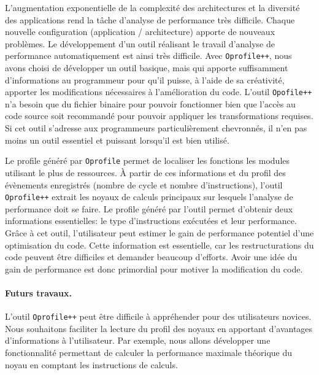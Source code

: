     L'augmentation exponentielle de la complexité des architectures et la diversité des applications rend la tâche d'analyse de performance très difficile. Chaque nouvelle configuration (application / architecture) apporte de nouveaux problèmes. Le développement d'un outil réalisant le travail d'analyse de performance automatiquement est ainsi très difficile. Avec \verb|Oprofile++|, nous avons choisi de développer un outil basique, mais qui apporte suffisamment d'informations au programmeur pour qu'il puisse, à l'aide de sa créativité, apporter les modifications nécessaires à l'amélioration du code. L'outil \verb|Opofile++| n'a besoin que du fichier binaire pour pouvoir fonctionner bien que l'accès au code source soit recommandé pour pouvoir appliquer les transformations requises. Si cet outil s'adresse aux programmeurs particulièrement chevronnés, il n'en pas moins un outil essentiel et puissant lorsqu'il est bien utilisé. 
    
    Le profile généré par \verb|Oprofile| permet de localiser les fonctions les modules utilisant le plus de ressources. À partir de ces informations et du profil des évènements enregistrés (nombre de cycle et nombre d'instructions), l'outil \verb|Oprofile++| extrait les noyaux de calculs principaux sur lesquels l'analyse de performance doit se faire. Le profile généré par l'outil permet d'obtenir deux informations essentielles: le type d'instructions exécutées et leur performance. Grâce à cet outil, l'utilisateur peut estimer le gain de performance potentiel d'une optimisation du code. Cette information est essentielle, car les restructurations du code peuvent être difficiles et demander beaucoup d'efforts. Avoir une idée du gain de performance est donc primordial pour motiver la modification du code. 


    \paragraph{Futurs travaux.} L'outil \verb|Oprofile++| peut être difficile à appréhender pour des utilisateurs novices. Nous souhaitons faciliter la lecture du profil des noyaux en apportant d'avantages d'informations à l'utilisateur. Par exemple, nous allons développer une fonctionnalité permettant de calculer la performance maximale théorique du noyau en comptant les instructions de calculs.
    